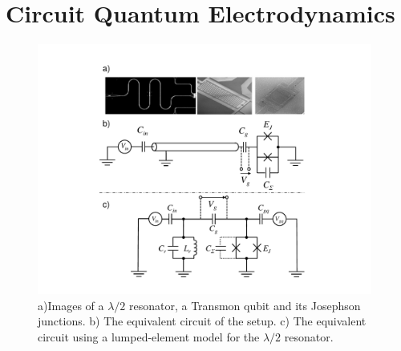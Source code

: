 \section{Circuit Quantum Electrodynamics}

\begin{figure}
	\includegraphics[width=11cm]{"./material/figures/introduction/cqed/cqed"}
	\caption{a)Images of a $\lambda/2$ resonator, a Transmon qubit and its Josephson junctions. b) The equivalent circuit of the setup. c) The equivalent circuit using a lumped-element model for the $\lambda/2$ resonator.}
	\label{fig:CQED}
\end{figure}


